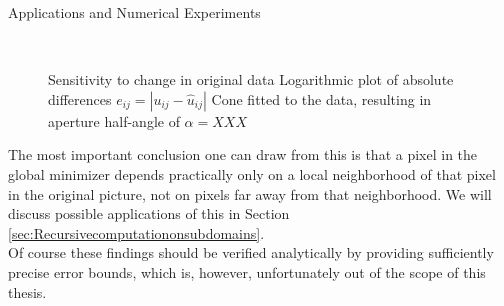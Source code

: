 \begin{chapter}{Applications and Numerical Experiments}
\begin{figure}[h!]
    \centering
    \\
    \caption[Sensitivity to variation]{Sensitivity to change in original data
	 Logarithmic plot of absolute differences $e_{ij}=|u_{ij}-\hat{u}_{ij}|$
	 Cone fitted to the data, resulting in aperture half-angle of $\alpha=XXX$
	\label{fig:experiment_sensitivity}
    }
\end{figure}

The most important conclusion one can draw from this is that a pixel in the global minimizer depends practically only on a local neighborhood of that pixel
in the original picture, not on pixels far away from that neighborhood. We will discuss possible applications of this in Section \ref{sec:Recursivecomputationonsubdomains}.\\

Of course these findings should be verified analytically by providing sufficiently precise error bounds, which is, however, unfortunately out of the scope of this thesis.


\end{chapter}
